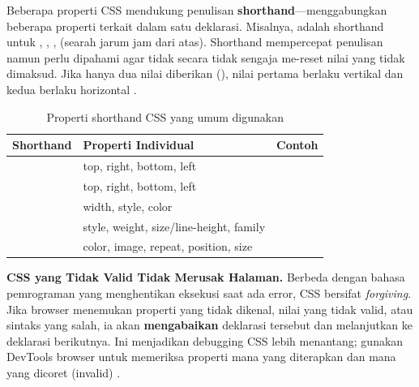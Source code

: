 Beberapa properti CSS mendukung penulisan \textbf{shorthand}---menggabungkan beberapa properti terkait dalam satu deklarasi. Misalnya,  adalah shorthand untuk , , ,  (searah jarum jam dari atas). Shorthand mempercepat penulisan namun perlu dipahami agar tidak secara tidak sengaja me-reset nilai yang tidak dimaksud. Jika hanya dua nilai diberikan (), nilai pertama berlaku vertikal dan kedua berlaku horizontal \cite{cssTricks}.

\begin{table}[H]
\centering
\begin{tabular}{|P{3cm}|P{4.5cm}|P{4.5cm}|}
\hline
\textbf{Shorthand} & \textbf{Properti Individual} & \textbf{Contoh} \\
\hline
{} & top, right, bottom, left &  \\
\hline
{} & top, right, bottom, left &  \\
\hline
{} & width, style, color &  \\
\hline
{} & style, weight, size/line-height, family &  \\
\hline
{} & color, image, repeat, position, size &  \\
\hline
\end{tabular}
\caption{Properti shorthand CSS yang umum digunakan}
\end{table}


\begin{konsep}
\textbf{CSS yang Tidak Valid Tidak Merusak Halaman.} Berbeda dengan bahasa pemrograman yang menghentikan eksekusi saat ada error, CSS bersifat \textit{forgiving}. Jika browser menemukan properti yang tidak dikenal, nilai yang tidak valid, atau sintaks yang salah, ia akan \textbf{mengabaikan} deklarasi tersebut dan melanjutkan ke deklarasi berikutnya. Ini menjadikan debugging CSS lebih menantang; gunakan DevTools browser untuk memeriksa properti mana yang diterapkan dan mana yang dicoret (invalid) \cite{mdnCss}.
\end{konsep}

